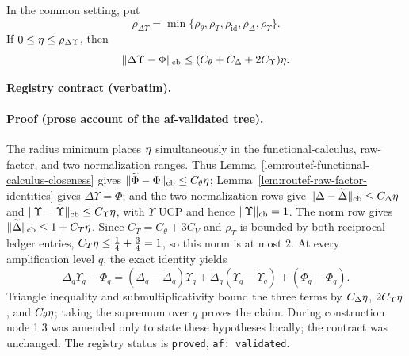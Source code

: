 \begin{lemma}\label{lem:routef-delta-upsilon-telescope}
In the common setting, put
\[
 \rho_{\Delta\Upsilon}=\min\{\rho_{\theta},\rho_T,\rho_{\mathrm{id}},
 \rho_{\Delta},\rho_{\Upsilon}\}.
\]
If $0\le\eta\le\rho_{\Delta\Upsilon}$, then
\[
 \lVert \Delta\Upsilon-\Phi\rVert_{\mathrm{cb}}
 \le (C_{\theta}+C_{\Delta}+2C_{\Upsilon})\eta .
\]
\end{lemma}
\noindent\textbf{Registry contract (verbatim).} 
\paragraph{Proof (prose account of the af-validated tree).}
The radius minimum places $\eta$ simultaneously in the functional-calculus, raw-factor,
and two normalization ranges. Thus Lemma~\ref{lem:routef-functional-calculus-closeness}
gives $\lVert \widetilde\Phi-\Phi\rVert_{\mathrm{cb}}\le C_{\theta}\eta$;
Lemma~\ref{lem:routef-raw-factor-identities} gives
$\widetilde\Delta\widetilde\Upsilon=\widetilde\Phi$; and the two normalization rows give
$\lVert \Delta-\widetilde\Delta\rVert_{\mathrm{cb}}\le C_{\Delta}\eta$ and
$\lVert \Upsilon-\widetilde\Upsilon\rVert_{\mathrm{cb}}\le C_{\Upsilon}\eta$, with
$\Upsilon$ UCP and hence $\lVert \Upsilon\rVert_{\mathrm{cb}}=1$. The norm row gives
$\lVert \widetilde\Delta\rVert_{\mathrm{cb}}\le1+C_T\eta$. Since
$C_T=C_{\theta}+3C_V$ and $\rho_T$ is bounded by both reciprocal ledger entries,
$C_T\eta\le\tfrac14+\tfrac34=1$, so this norm is at most $2$. At every amplification
level $q$, the exact identity yields
\[
 \Delta_q\Upsilon_q-\Phi_q=(\Delta_q-\widetilde\Delta_q)\Upsilon_q
 +\widetilde\Delta_q(\Upsilon_q-\widetilde\Upsilon_q)
 +(\widetilde\Phi_q-\Phi_q).
\]
Triangle inequality and submultiplicativity bound the three terms by
$C_{\Delta}\eta$, $2C_{\Upsilon}\eta$, and $C_{\theta}\eta$; taking the
supremum over $q$ proves the claim. During construction node 1.3 was amended only to state
these hypotheses locally; the contract was unchanged. The registry status is
\texttt{proved}, \texttt{af: validated}.

